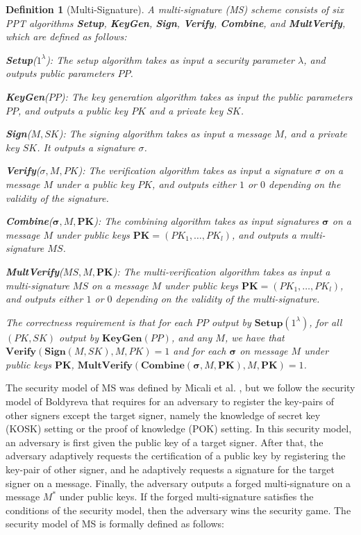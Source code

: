 \documentclass[11pt,letterpaper]{article}
\newcommand{\vect}[1]{\mathbf{#1}}
\newtheorem{definition}[theorem]{Definition}
\newcommand{\tb}[1]{\textbf{#1}}
\begin{document}
\begin{definition}[Multi-Signature]
A multi-signature (MS) scheme consists of six PPT algorithms \tb{Setup},
\tb{KeyGen}, \tb{Sign}, \tb{Verify}, \tb{Combine}, and \tb{MultVerify}, which
are defined as follows:
\begin{description}
\item \tb{Setup}($1^\lambda$): The setup algorithm takes as input a
    security parameter $\lambda$, and outputs public parameters $PP$.

\item \tb{KeyGen}($PP$): The key generation algorithm takes as input the
    public parameters $PP$, and outputs a public key $PK$ and a private key
    $SK$.

\item \tb{Sign}($M, SK$): The signing algorithm takes as input a message
    $M$, and a private key $SK$. It outputs a signature $\sigma$.

\item \tb{Verify}($\sigma, M, PK$): The verification algorithm takes as
    input a signature $\sigma$ on a message $M$ under a public key $PK$,
    and outputs either $1$ or $0$ depending on the validity of the
    signature.

\item \tb{Combine}($\vect{\sigma}, M, \vect{PK}$): The combining algorithm
    takes as input signatures $\vect{\sigma}$ on a message $M$ under public
    keys $\vect{PK} = (PK_1, \ldots, PK_l)$, and outputs a multi-signature
    $MS$.

\item \tb{MultVerify}($MS, M, \vect{PK}$): The multi-verification algorithm
    takes as input a multi-signature $MS$ on a message $M$ under public
    keys $\vect{PK} = (PK_1, \ldots, PK_l)$, and outputs either $1$ or $0$
    depending on the validity of the multi-signature.
\end{description}
The correctness requirement is that for each $PP$ output by
$\tb{Setup}(1^\lambda)$, for all $(PK,SK)$ output by $\tb{KeyGen}(PP)$, and
any $M$, we have that $\tb{Verify} (\tb{Sign}(M, SK), M, PK) = 1$ and for
each $\vect{\sigma}$ on message $M$ under public keys $\vect{PK}$,
$\tb{MultVerify} (\tb{Combine} (\vect{\sigma}, M, \vect{PK}), M, \vect{PK}) =
1$.
\end{definition}

The security model of MS was defined by Micali et al. \cite{MicaliOR01}, but
we follow the security model of Boldyreva \cite{Boldyreva03} that requires
for an adversary to register the key-pairs of other signers except the target
signer, namely the knowledge of secret key (KOSK) setting or the proof of
knowledge (POK) setting. In this security model, an adversary is first given
the public key of a target signer. After that, the adversary adaptively
requests the certification of a public key by registering the key-pair of
other signer, and he adaptively requests a signature for the target signer on
a message. Finally, the adversary outputs a forged multi-signature on a
message $M^*$ under public keys. If the forged multi-signature satisfies the
conditions of the security model, then the adversary wins the security game.
The security model of MS is formally defined as follows:
\end{document}
